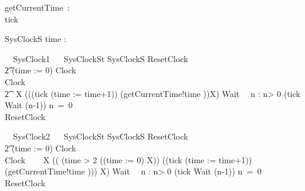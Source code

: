 
\begin{circus}
  \circchannel getCurrentTime~:~\nat\\
  \circchannel tick
\end{circus}

\begin{schema}{SysClockS}
 time : \nat
\end{schema}

\begin{circus}%
  \circprocess\ ~SysClock1 ~\circdef~\circbegin
  \circstate SysClockSt  SysClockS
  ResetClock ~\circdef~
  \\\t2  (time := 0) \circseq Clock\\
  Clock ~\circdef~
  \\\t2  \circmu~X \circspot  (((tick \then (time := time+1)) \interleave (getCurrentTime!time \then \Skip))\circseq X)
  Wait~\circdef~ \circvar n : \nat \circspot
   \circif n> 0 \circthen (tick \then Wait (n-1))
   \circelse n~=~0 \circthen \Skip
   \circfi\\
  \circspot ResetClock
  \circend
\end{circus}
\begin{circus}%
  \circprocess\ ~SysClock2 ~\circdef~\circbegin
  \circstate SysClockSt  SysClockS
  ResetClock ~\circdef~
  \\\t2  (time := 0) \circseq Clock\\
  Clock ~\circdef~ 
  \circmu~X \circspot 
    ((
      (\lcircguard time > 2 \rcircguard \circguard ((time := 0) \circseq X))
        \extchoice 
          ((tick \then (time := time+1)) 
            \interleave (getCurrentTime!time \then \Skip)))
          \circseq X)
  Wait~\circdef~ \circvar n : \nat \circspot
   \circif n> 0 \circthen (tick \then Wait (n-1))
   \circelse n~=~0 \circthen \Skip
   \circfi\\
  \circspot ResetClock
  \circend
\end{circus}
